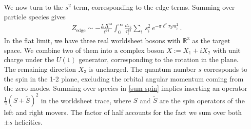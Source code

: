 \documentclass[aps,prl, reprint, superscriptaddress, 10pt]{revtex4-2}
\newcommand{\1}{\textbf{1}}
\newcommand{\half}{\frac{1}{2}}
\newcommand{\+}{{\,+ \,}}
\begin{document}
We now turn to the $s^2$ term, corresponding to the edge terms. Summing over particle species gives
\begin{equation}\label{sum-spin}
	\begin{split}
	Z_{\text{edge}} \sim - \frac{L\,R^{23}}{ \ell^{ 24} } \int_0^\infty \frac{d\tau_2}{\tau_2^{13}} \sum_i \, s_i^2 \, e^{ - \pi \ell^2\tau_2 m_i^2} \, .
	\end{split}
\end{equation}
In the flat limit, we have three real worldsheet bosons with $\mathbb{R}^3$ as the target space. We combine two of them into a complex boson $X:= X_1 + i X_2$ with unit charge under the $U(1)$ generator, corresponding to the rotation in the plane. The remaining direction $X_3$ is uncharged. The quantum number $s$ corresponds to the spin in the 1-2 plane, excluding the orbital angular momentum coming from the zero modes. Summing over species in \eqref{sum-spin} implies inserting an operator $\half (S + \tilde{S})^2$ in the worldsheet trace, where $S$ and $\tilde S$ are the spin operators of the left and right movers. The factor of half accounts for the fact we sum over both $\pm s$ helicities.
\end{document}
